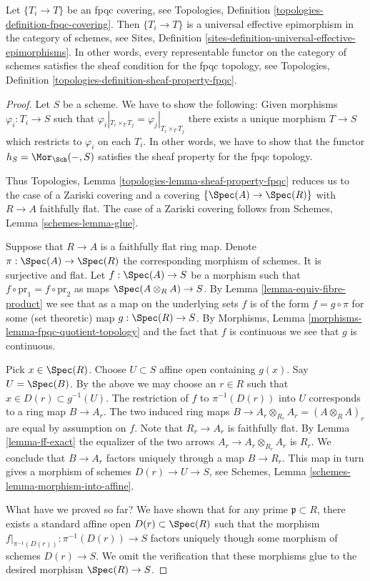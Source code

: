 \begin{lemma}
\label{lemma-fpqc-universal-effective-epimorphisms}
Let $\{T_i \to T\}$ be an fpqc covering, see
Topologies, Definition \ref{topologies-definition-fpqc-covering}.
Then $\{T_i \to T\}$ is a universal effective epimorphism
in the category of schemes, see
Sites, Definition \ref{sites-definition-universal-effective-epimorphisms}.
In other words, every representable functor on the category of schemes
satisfies the sheaf condition for the fpqc topology, see
Topologies, Definition \ref{topologies-definition-sheaf-property-fpqc}.
\end{lemma}

\begin{proof}
Let $S$ be a scheme. We have to show the following:
Given morphisms $\varphi_i : T_i \to S$
such that $\varphi_i|_{T_i \times_T T_j} = \varphi_j|_{T_i \times_T T_j}$
there exists a unique morphism $T \to S$ which restricts
to $\varphi_i$ on each $T_i$.
In other words, we have to show that the functor
$h_S = \Mor_{\Sch}( - , S)$ satisfies
the sheaf property for the fpqc topology.

\medskip\noindent
Thus Topologies, Lemma \ref{topologies-lemma-sheaf-property-fpqc}
reduces us to the case of a Zariski covering and a covering
$\{\Spec(A) \to \Spec(R)\}$ with $R \to A$ faithfully flat.
The case of a Zariski covering follows from
Schemes, Lemma \ref{schemes-lemma-glue}.

\medskip\noindent
Suppose that $R \to A$ is a faithfully flat ring map.
Denote $\pi : \Spec(A) \to \Spec(R)$ the
corresponding morphism of schemes. It is surjective and flat.
Let $f : \Spec(A) \to S$ be a morphism
such that $f \circ \text{pr}_1 = f \circ \text{pr}_2$
as maps $\Spec(A \otimes_R A) \to S$.
By Lemma \ref{lemma-equiv-fibre-product} we see that
as a map on the underlying
sets $f$ is of the form $f = g \circ \pi$ for some
(set theoretic) map $g : \Spec(R) \to S$.
By Morphisms, Lemma \ref{morphisms-lemma-fpqc-quotient-topology}
and the fact that $f$ is continuous we see that $g$
is continuous.

\medskip\noindent
Pick $x \in \Spec(R)$.
Choose $U \subset S$ affine open containing $g(x)$.
Say $U = \Spec(B)$.
By the above we may choose an $r \in R$ such that
$x \in D(r) \subset g^{-1}(U)$.
The restriction of $f$ to $\pi^{-1}(D(r))$ into $U$
corresponds to a ring map $B \to A_r$. The two induced
ring maps $B \to A_r \otimes_{R_r} A_r = (A \otimes_R A)_r$ are equal
by assumption on $f$.
Note that $R_r \to A_r$ is faithfully flat.
By Lemma \ref{lemma-ff-exact} the equalizer of
the two arrows $A_r \to A_r \otimes_{R_r} A_r$ is $R_r$.
We conclude that $B \to A_r$ factors uniquely through a map $B \to R_r$.
This map in turn gives a morphism of schemes $D(r) \to U \to S$,
see Schemes, Lemma \ref{schemes-lemma-morphism-into-affine}.

\medskip\noindent
What have we proved so far? We have shown that for any prime
$\mathfrak p \subset R$, there exists a standard affine open
$D(r) \subset \Spec(R)$ such that the morphism
$f|_{\pi^{-1}(D(r))} : \pi^{-1}(D(r)) \to S$ factors uniquely
though some morphism of schemes $D(r) \to S$. We omit the
verification that these morphisms glue to the desired
morphism $\Spec(R) \to S$.
\end{proof}

